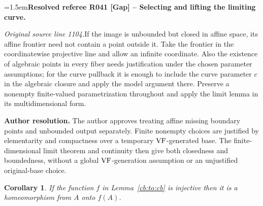 \documentclass[12pt]{amsart}
\newcommand{\ResolvedRefereeRemark}[5]{%
  \par\medskip\begingroup\normalfont\small\color{gray}%
  \emergencystretch=1.5em\noindent\textbf{Resolved referee R#1 [#2] -- #3.}\par\nobreak\noindent #4\par
  \medskip\color{ResolutionGreen}\noindent\textbf{Author resolution.} #5\par
  \endgroup\medskip
}
\theoremstyle{plain}
\newtheorem{cor}[thm]{Corollary}
\theoremstyle{definition}
\theoremstyle{remark}
\numberwithin{equation}{section}
\theoremstyle{plain}
\newcommand{\VF}{\textup{VF}}
\newcommand{\0}{\emptyset}
\begin{document}
\ResolvedRefereeRemark{041}{Gap}{Selecting and lifting the limiting curve}{%
\textit{Original source line 1104.}\quad If the image is unbounded but closed in affine space, its affine frontier need not contain a point outside it. Take the frontier in the coordinatewise projective line and allow an infinite coordinate. Also the existence of algebraic points in every fiber needs justification under the chosen parameter assumptions; for the curve pullback it is enough to include the curve parameter $c$ in the algebraic closure and apply the model argument there. Preserve a nonempty finite-valued parametrization throughout and apply the limit lemma in its multidimensional form.
}{The author approves treating affine missing boundary points and unbounded output separately. Finite nonempty choices are justified by elementarity and compactness over a temporary $\VF$-generated base. The finite-dimensional limit theorem and continuity then give both closedness and boundedness, without a global $\VF$-generation assumption or an unjustified original-base choice.}



\begin{cor}\label{conti:homeo}
If the function $f$ in Lemma~\ref{cb:to:cb} is injective then  it is a homeomorphism from $A$ onto $f(A)$.
\end{cor}
\end{document}
